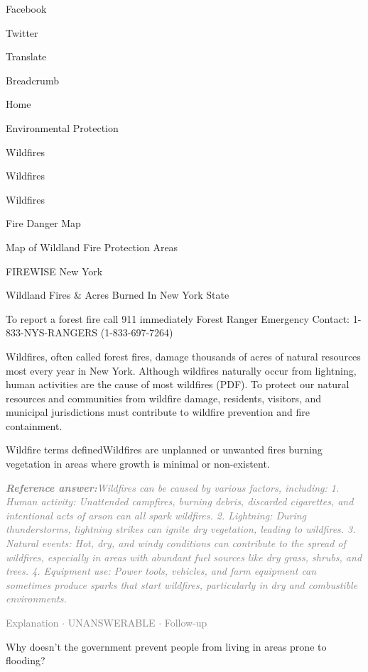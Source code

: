 \documentclass[a4paper,11pt]{article}
\begin{document}
\begin{docenv}
{Facebook

Twitter

Translate

Breadcrumb

Home

Environmental Protection

Wildfires

Wildfires

Wildfires

Fire Danger Map

Map of Wildland Fire Protection Areas

FIREWISE New York

Wildland Fires \& Acres Burned In New York State

To report a forest fire call 911 immediately
Forest Ranger Emergency Contact:
1-833-NYS-RANGERS (1-833-697-7264)

Wildfires, often called forest fires, damage thousands of acres of natural resources most every year in New York. Although wildfires naturally occur from lightning, human activities are the cause of most wildfires (PDF). To protect our natural resources and communities from wildfire damage, residents, visitors, and municipal jurisdictions must contribute to wildfire prevention and fire containment.

Wildfire terms definedWildfires are unplanned or unwanted fires burning vegetation in areas where growth is minimal or non-existent.}
\end{docenv}
\begin{refanswerenv}
{\footnotesize\textit{\textcolor{gray}{\textbf{Reference answer:}\enspace Wildfires can be caused by various factors, including:
1. Human activity: Unattended campfires, burning debris, discarded cigarettes, and intentional acts of arson can all spark wildfires.
2. Lightning: During thunderstorms, lightning strikes can ignite dry vegetation, leading to wildfires.
3. Natural events: Hot, dry, and windy conditions can contribute to the spread of wildfires, especially in areas with abundant fuel sources like dry grass, shrubs, and trees.
4. Equipment use: Power tools, vehicles, and farm equipment can sometimes produce sparks that start wildfires, particularly in dry and combustible environments.}}}
\end{refanswerenv}
\vspace{0.5em}
\hfill{\tiny\textcolor{gray}{Explanation $\cdot$ UNANSWERABLE $\cdot$ Follow-up}}
\begin{userbubble}
Why doesn't the government prevent people from living in areas prone to flooding?
\end{userbubble}
\end{document}
